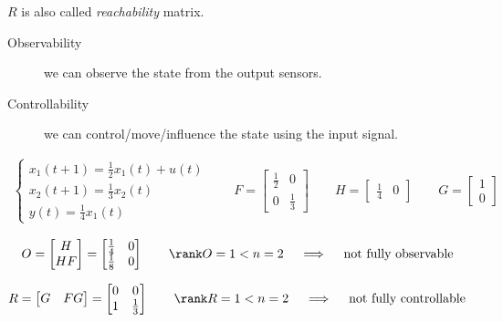 $R$ is also called \emph{reachability} matrix.

\begin{rem}
    \begin{description}
        \item[Observability] we can observe the state from the output sensors.
        \item[Controllability] we can control/move/influence the state using the input signal.
    \end{description}
\end{rem}

\begin{exa}
    \begin{align*}
        \begin{cases}
            x_1(t+1) = \frac{1}{2} x_1(t) + u(t) \\
            x_2(t+1) = \frac{1}{3}x_2(t) \\
            y(t) = \frac{1}{4}x_1(t)
        \end{cases}
        \qquad
        F = \begin{bmatrix}
            \frac{1}{2} & 0 \\
            0 & \frac{1}{3}
        \end{bmatrix}
        \qquad
        H = \begin{bmatrix}
            \frac{1}{4} & 0
        \end{bmatrix}
        \qquad
        G = \begin{bmatrix}
            1 \\
            0
        \end{bmatrix}
    \end{align*}

    \[
        O = \begin{bmatrix}
            H \\
            HF
        \end{bmatrix} = \begin{bmatrix}
            \frac{1}{4} & 0 \\
            \frac{1}{8} & 0
        \end{bmatrix}
        \qquad
        \rank O = 1 < n = 2
        \quad\implies\quad \text{not fully observable}
    \]

    \[
        R = \begin{bmatrix}
            G & FG
        \end{bmatrix} = \begin{bmatrix}
            0 & 0 \\
            1 & \frac{1}{3}
        \end{bmatrix}
        \qquad
        \rank R = 1 < n = 2
        \quad\implies\quad \text{not fully controllable}
    \]
\end{exa}

